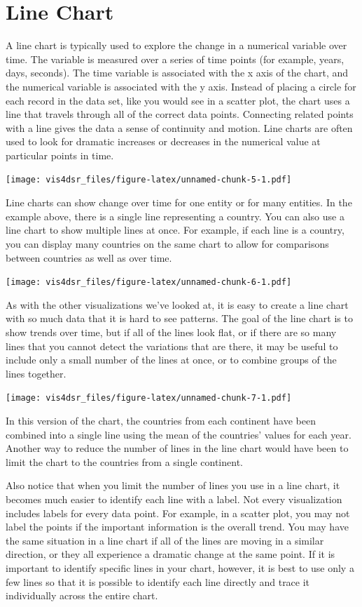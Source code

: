\documentclass[
]{krantz}
\begin{document}
\hypertarget{line-chart}{%
\section{Line Chart}\label{line-chart}}

A line chart is typically used to explore the change in a numerical variable over time.
The variable is measured over a series of time points (for example, years, days, seconds).
The time variable is associated with the x axis of the chart, and the numerical variable
is associated with the y axis. Instead of placing a circle for each record in the
data set, like you would see in a scatter plot, the chart uses a line that travels
through all of the correct data points. Connecting related points with a line
gives the data a sense of continuity and motion. Line charts are often used to look
for dramatic increases or decreases in the numerical value at particular points in time.

\texttt{[image: vis4dsr\_files/figure-latex/unnamed-chunk-5-1.pdf]}

Line charts can show change over time for one entity or for many entities. In the example
above, there is a single line representing a country. You can also use a line chart
to show multiple lines at once. For example, if each line is a country, you can display
many countries on the same chart to allow for comparisons between countries as well as
over time.

\texttt{[image: vis4dsr\_files/figure-latex/unnamed-chunk-6-1.pdf]}

As with the other visualizations we've looked at, it is easy to create a line chart
with so much data that it is hard to see patterns. The goal of the line chart is to
show trends over time, but if all of the lines look flat, or if there are so many
lines that you cannot detect the variations that are there, it may be useful to include
only a small number of the lines at once, or to combine groups of the lines together.

\texttt{[image: vis4dsr\_files/figure-latex/unnamed-chunk-7-1.pdf]}

In this version of the chart, the countries from each continent have been combined
into a single line using the mean of the countries' values for each year. Another way to
reduce the number of lines in the line chart would have been to limit the chart to
the countries from a single continent.

Also notice that when you limit the number of lines you use in a line chart, it
becomes much easier to identify each line with a label. Not every visualization
includes labels for every data point. For example, in a scatter plot, you may not
label the points if the important information is the overall trend. You may have
the same situation in a line chart if all of the lines are moving in a similar
direction, or they all experience a dramatic change at the same point. If it is
important to identify specific lines in your chart, however, it is best to use only
a few lines so that it is possible to identify each line directly and trace it
individually across the entire chart.
\end{document}
